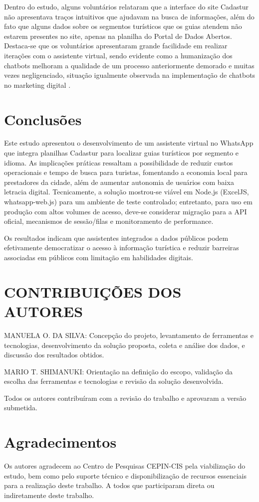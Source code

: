 \documentclass[a4paper,11pt]{article} %
\begin{document}
Dentro do estudo, alguns voluntários relataram que a interface do site Cadastur não apresentava traços intuitivos que ajudavam na busca de informações, além do fato que alguns dados sobre os segmentos turísticos que os guias atendem não estarem presentes no site, apenas na planilha do Portal de Dados Abertos. Destaca-se que os voluntários apresentaram grande facilidade em realizar iterações com o assistente virtual, sendo evidente como a humanização dos chatbots melhoram a qualidade de um processo anteriormente demorado e muitas vezes negligenciado, situação igualmente observada na implementação de chatbots no marketing digital \cite{vitor}.


\section*{Conclusões}

Este estudo apresentou o desenvolvimento de um assistente virtual no WhatsApp que integra planilhas Cadastur para localizar guias turísticos por segmento e idioma. As implicações práticas ressaltam a possibilidade de reduzir custos operacionais e tempo de busca para turistas, fomentando a economia local para prestadores da cidade, além de aumentar autonomia de usuários com baixa letracia digital. Tecnicamente, a solução mostrou-se viável em Node.js (ExcelJS, whatsapp-web.js) para um ambiente de teste controlado; entretanto, para uso em produção com altos volumes de acesso, deve-se considerar migração para a API oficial, mecanismos de sessão/filas e monitoramento de performance.

Os resultados indicam que assistentes integrados a dados públicos podem efetivamente democratizar o acesso à informação turística e reduzir barreiras associadas em públicos com limitação em habilidades digitais.

\section*{CONTRIBUIÇÕES DOS AUTORES}

MANUELA O. DA SILVA:  Concepção do projeto, levantamento de ferramentas e tecnologias, desenvolvimento da solução proposta, coleta e análise dos dados, e discussão dos resultados obtidos.

MARIO T. SHIMANUKI: Orientação na definição do escopo, validação da escolha das ferramentas e tecnologias e revisão da solução desenvolvida.

Todos os autores contribuíram com a revisão do trabalho e aprovaram a versão submetida.

\section*{Agradecimentos}
Os autores agradecem ao Centro de Pesquisas CEPIN-CIS pela viabilização do estudo, bem como pelo suporte técnico e disponibilização de recursos essenciais para a realização deste trabalho. A todos que participaram direta ou indiretamente deste trabalho.




\end{document}
